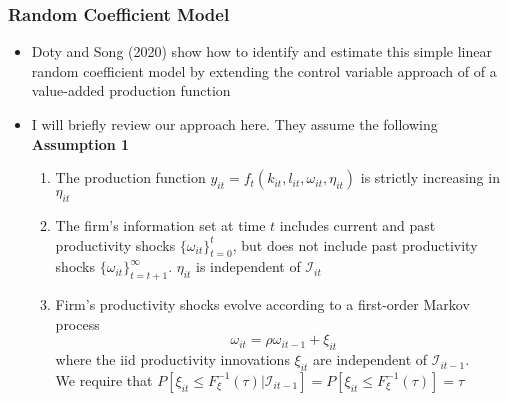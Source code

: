 \documentclass{beamer}
\begin{document}

\begin{frame}
\frametitle{Random Coefficient Model}
\begin{itemize}
\item Doty and Song (2020) show how to identify and estimate this simple linear random coefficient model by extending the control variable approach of \cite{Levinsohn2003} of a value-added production function
\item I will briefly review our approach here. They assume the following
\textbf{Assumption 1}
\begin{enumerate}
	\item The production function $y_{it}=f_{t}(k_{it}, l_{it}, \omega_{it}, \eta_{it})$ is strictly increasing in $\eta_{it}$
	\item The firm's information set at time $t$ includes current and past productivity shocks $\{\omega_{it}\}_{t=0}^{t}$, but does not include past productivity shocks $\{\omega_{it}\}_{t=t+1}^{\infty}$. $\eta_{it}$ is independent of $\mathcal{I}_{it}$
	\item Firm's productivity shocks evolve according to a first-order Markov process
	\begin{equation}
	\omega_{it}=\rho\omega_{it-1}+\xi_{it}
	\end{equation}
	where the iid productivity innovations $\xi_{it}$ are independent of $\mathcal{I}_{it-1}$.\\
	We require that $P[\xi_{it}\leq F_{\xi}^{-1}(\tau)|\mathcal{I}_{it-1}]=P[\xi_{it}\leq F_{\xi}^{-1}(\tau)]=\tau$
\end{enumerate}
\end{itemize}
\end{frame}

\end{document}
